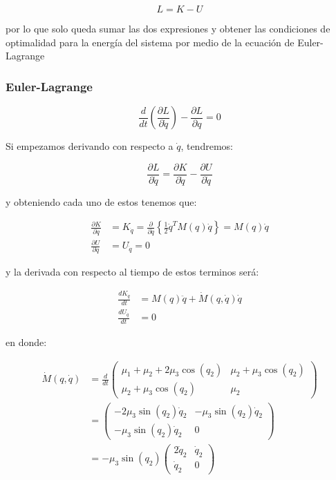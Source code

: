 \documentclass{article}
\begin{document}
\[
L = K - U
\]

por lo que solo queda sumar las dos expresiones y obtener las
condiciones de optimalidad para la energía del sistema por medio de la
ecuación de Euler-Lagrange

    \subsubsection*{Euler-Lagrange}\label{euler-lagrange}

    \[
\frac{d}{dt} \left( \frac{\partial L}{\partial \dot{q}} \right) - \frac{\partial L}{\partial q} = 0
\]

Si empezamos derivando con respecto a \(\dot{q}\), tendremos:

\[
\frac{\partial L}{\partial \dot{q}} = \frac{\partial K}{\partial \dot{q}} - \frac{\partial U}{\partial \dot{q}}
\]

y obteniendo cada uno de estos tenemos que:

\[
\begin{align}
\frac{\partial K}{\partial \dot{q}} &= K_{\dot{q}} = \frac{\partial}{\partial \dot{q}} \left\{ \frac{1}{2} \dot{q}^T M(q) \dot{q} \right\} = M(q) \dot{q} \\
\frac{\partial U}{\partial \dot{q}} &= U_{\dot{q}} = 0
\end{align}
\]

y la derivada con respecto al tiempo de estos terminos será:

\[
\begin{align}
\frac{d K_{\dot{q}}}{dt} &= M(q) \ddot{q} + \dot{M}(q, \dot{q}) \dot{q} \\
\frac{d U_{\dot{q}}}{dt} &= 0
\end{align}
\]

en donde:

\[
\begin{align}
\dot{M}(q, \dot{q}) &= \frac{d}{dt}
\begin{pmatrix}
\mu_1 + \mu_2 + 2\mu_3 \cos{(q_2)} & \mu_2 + \mu_3 \cos{(q_2)} \\
\mu_2 + \mu_3 \cos{(q_2)} & \mu_2
\end{pmatrix} \\
&=
\begin{pmatrix}
-2 \mu_3 \sin{(q_2)} \dot{q}_2 & -\mu_3 \sin{(q_2)} \dot{q}_2 \\
-\mu_3 \sin{(q_2)} \dot{q}_2 & 0
\end{pmatrix} \\
&= -\mu_3 \sin{(q_2)}
\begin{pmatrix}
2 \dot{q}_2 & \dot{q}_2 \\
\dot{q}_2 & 0
\end{pmatrix}
\end{align}
\]
\end{document}
